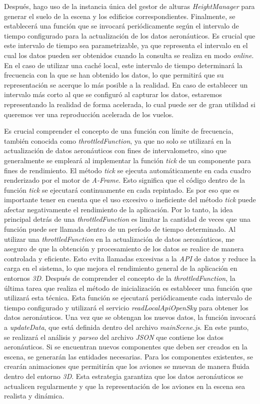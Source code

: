 \documentclass[a4paper, 11pt]{book}
\begin{document}
Después, hago uso de la instancia única del gestor de alturas \emph{HeightManager} para generar el suelo de la escena y los edificios correspondientes.
Finalmente, se establecerá una función que se invocará periódicamente según el intervalo de tiempo configurado para la actualización de los datos aeronáuticos. Es crucial que este intervalo de tiempo sea parametrizable, ya que representa el intervalo en el cual los datos pueden ser obtenidos cuando la consulta se realiza en modo \emph{online}. En el caso de utilizar una caché local, este intervalo de tiempo determinará la frecuencia con la que se han obtenido los datos, lo que permitirá que su representación se acerque lo más posible a la realidad. En caso de establecer un intervalo más corto al que se configuró al capturar los datos, estaremos representando la realidad de forma acelerada, lo cual puede ser de gran utilidad si queremos ver una reproducción acelerada de los vuelos.

Es crucial comprender el concepto de una función con límite de frecuencia, también conocida como \emph{throttledFunction}, ya que no solo se utilizará en la actualización de datos aeronáuticos con fines de intervalometro, sino que generalmente se empleará al implementar la función \emph{tick} de un componente para fines de rendimiento. El método \emph{tick} se ejecuta automáticamente en cada cuadro renderizado por el motor de \emph{A-Frame}. Esto significa que el código dentro de la función \emph{tick} se ejecutará continuamente en cada repintado.
Es por eso que es importante tener en cuenta que el uso excesivo o ineficiente del método \emph{tick} puede afectar negativamente el rendimiento de la aplicación. 
Por lo tanto, la idea principal detrás de una \emph{throttledFunction} es limitar la cantidad de veces que una función puede ser llamada dentro de un período de tiempo determinado.
Al utilizar una \emph{throttledFunction} en la actualización de datos aeronáuticos, me aseguro de que la obtención y procesamiento de los datos se realice de manera controlada y eficiente. Esto evita llamadas excesivas a la \emph{\gls{API}} de datos y reduce la carga en el sistema, lo que mejora el rendimiento general de la aplicación en entornos \emph{3D}.
Después de comprender el concepto de la \emph{throttledFunction}, la última tarea que realiza el método de inicialización es establecer una función que utilizará esta técnica. Esta función se ejecutará periódicamente cada intervalo de tiempo configurado y utilizará el servicio \emph{readLocalApiOpenSky} para obtener los datos aeronáuticos.
Una vez que se obtengan los nuevos datos, la función invocará a \emph{updateData}, que está definida dentro del archivo \emph{mainScene.js}. En este punto, se realizará el análisis y \emph{parseo} del archivo \emph{\gls{JSON}} que contiene los datos aeronáuticos. Si se encuentran nuevos componentes que deben ser creados en la escena, se generarán las entidades necesarias. Para los componentes existentes, se crearán animaciones que permitirán que los aviones se muevan de manera fluida dentro del entorno \emph{3D}.
Esta estrategia garantiza que los datos aeronáuticos se actualicen regularmente y que la representación de los aviones en la escena sea realista y dinámica.
\end{document}
